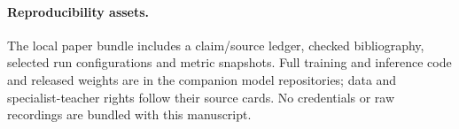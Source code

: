 \documentclass{article}
\begin{document}
\paragraph{Reproducibility assets.} The local paper bundle includes a claim/source ledger, checked bibliography, selected run configurations and metric snapshots. Full training and inference code and released weights are in the companion model repositories; data and specialist-teacher rights follow their source cards. No credentials or raw recordings are bundled with this manuscript.
\end{document}

